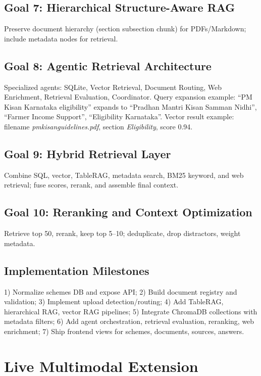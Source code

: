 \documentclass[11pt,a4paper]{article}
\begin{document}
\subsection{Goal 7: Hierarchical Structure-Aware RAG}
Preserve document hierarchy (section \textrightarrow{} subsection \textrightarrow{} chunk) for PDFs/Markdown; include metadata nodes for retrieval.

\subsection{Goal 8: Agentic Retrieval Architecture}
Specialized agents: SQLite, Vector Retrieval, Document Routing, Web Enrichment, Retrieval Evaluation, Coordinator. Query expansion example: ``PM Kisan Karnataka eligibility'' expands to ``Pradhan Mantri Kisan Samman Nidhi'', ``Farmer Income Support'', ``Eligibility Karnataka''. Vector result example: filename \textit{pm\textunderscore kisan\textunderscore guidelines.pdf}, section \textit{Eligibility}, score 0.94.

\subsection{Goal 9: Hybrid Retrieval Layer}
Combine SQL, vector, TableRAG, metadata search, BM25 keyword, and web retrieval; fuse scores, rerank, and assemble final context.

\subsection{Goal 10: Reranking and Context Optimization}
Retrieve top 50, rerank, keep top 5--10; deduplicate, drop distractors, weight metadata.

\subsection{Implementation Milestones}
1) Normalize schemes DB and expose API; 2) Build document registry and validation; 3) Implement upload detection/routing; 4) Add TableRAG, hierarchical RAG, vector RAG pipelines; 5) Integrate ChromaDB collections with metadata filters; 6) Add agent orchestration, retrieval evaluation, reranking, web enrichment; 7) Ship frontend views for schemes, documents, sources, answers.

\section{Live Multimodal Extension}
\end{document}
